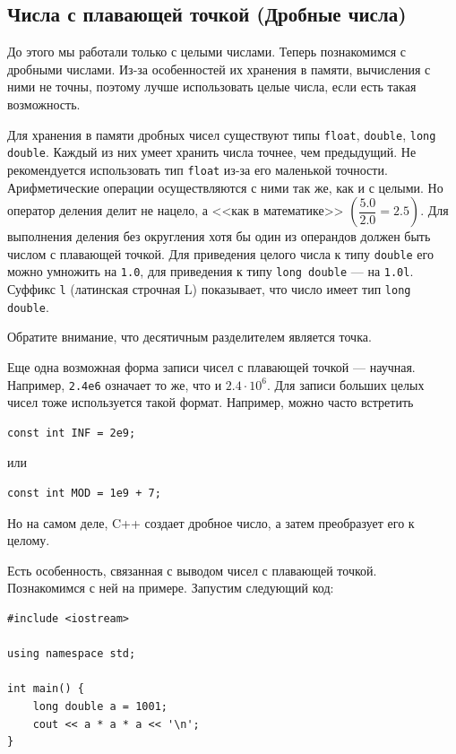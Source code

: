 \documentclass{article}
\begin{document}
	\subsection{Числа с плавающей точкой (Дробные числа)}
	
	До этого мы работали только с целыми числами. Теперь познакомимся с дробными числами. Из-за особенностей их хранения в памяти, вычисления с ними не точны, поэтому лучше использовать целые числа, если есть такая возможность.
	
	Для хранения в памяти дробных чисел существуют типы \texttt{float}, \texttt{double}, \texttt{long double}. Каждый из них умеет хранить числа точнее, чем предыдущий. Не рекомендуется использовать тип \texttt{float} из-за его маленькой точности. Арифметические операции осуществляются с ними так же, как и с целыми. Но оператор деления делит не нацело, а <<как в математике>> $\left(\dfrac{5.0}{2.0}=2.5\right)$. Для выполнения деления без округления хотя бы один из операндов должен быть числом с плавающей точкой. Для приведения целого числа к типу \texttt{double} его можно умножить на \texttt{1.0}, для приведения к типу \texttt{long double} --- на \texttt{1.0l}. Суффикс \texttt{l} (латинская строчная L) показывает, что число имеет тип \texttt{long double}.
	
	Обратите внимание, что десятичным разделителем является точка.
	
	Еще одна возможная форма записи чисел с плавающей точкой --- научная. Например, \texttt{2.4e6} означает то же, что и $2.4 \cdot 10 ^ 6$. Для записи больших целых чисел тоже используется такой формат. Например, можно часто встретить
	
	\begin{lstlisting}
const int INF = 2e9;
	\end{lstlisting}
	
	или 
	
	\begin{lstlisting}
const int MOD = 1e9 + 7;
	\end{lstlisting}
	
	Но на самом деле, C++ создает дробное число, а затем преобразует его к целому.
	
	Есть особенность, связанная с выводом чисел с плавающей точкой. Познакомимся с ней на примере. Запустим следующий код:
	
	\begin{lstlisting}
#include <iostream>

using namespace std;

int main() {
	long double a = 1001;
	cout << a * a * a << '\n';
}
	\end{lstlisting}
	
\end{document}
